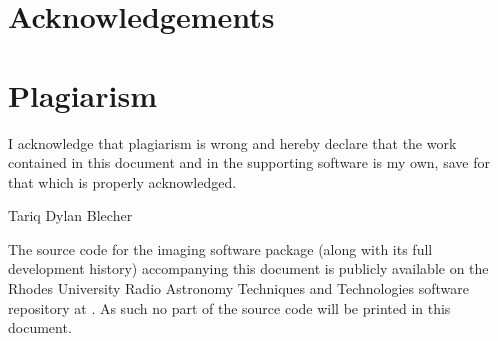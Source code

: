  
\chapter*{Acknowledgements}

\chapter*{Plagiarism}
 I acknowledge that plagiarism is wrong and hereby declare that the work contained in this document and in the supporting software is my own, save for that which is properly acknowledged.
 \vspace{55pt}
 
Tariq Dylan Blecher
 \clearpage
  \vspace*{\fill}
    \begin{center}
     \huge
     The source code for the imaging software package (along with its full development history) accompanying this document is publicly available on the Rhodes University Radio Astronomy 
     Techniques and Technologies software repository at . As such no part of the source code will be printed in this document.
    \end{center}
  \vspace*{\fill}
 \clearpage
{\let\clearpage\relax \tableofcontents \listoffigures \listoftables}